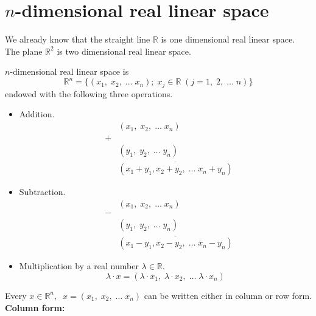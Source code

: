 \documentclass[color=black,11pt]{elegantpaper}
\begin{document}
\section{$n$-dimensional real linear space}
\label{sec:nspace}
We already know that the straight line $\mathbb{R}$ is one dimensional real linear space. The plane $\mathbb{R}^2$ is two dimensional real linear space.

\begin{definition}
\label{def:nspace}
 $n$-dimensional real linear space is
$$
\mathbb{R}^n =\{(x_1,\; x_2,\; \dots \; x_n);\;x_j \in \mathbb{R}\;(j=1,\;2,\;\dots\;n)\}
$$
endowed with the following three operations.
\begin{itemize}
\item[]Addition.
\begin{eqnarray*}
&& (x_1,\;x_2,\;\dots\;x_n) \\
&+&\\
&& (y_1,\; y_2,\; \dots \; y_n)\\
&&\overline{(x_1+y_1,x_2+y_2, \; \dots \; x_n+y_n)}
\end{eqnarray*}
\item[]Subtraction.
\begin{eqnarray*}
&& (x_1,\;x_2,\;\dots\;x_n) \\
&-&\\
&& (y_1,\; y_2,\; \dots \; y_n)\\
&&\overline{(x_1-y_1,x_2-y_2, \; \dots \; x_n-y_n)}
\end{eqnarray*}
\item[] Multiplication by a real number $\lambda \in \mathbb{R}.$
$$
\lambda \cdot x = (\lambda \cdot x_1,\; \lambda \cdot x_2,\; \dots\; \lambda \cdot x_n)
$$
\end{itemize}
\end{definition}
Every $x\in \mathbb{R}^n,\;\;x=(x_1,\;x_2,\;\dots\;x_n)$ can be written either in column or row form.\\
{\bf Column form:}\\
\end{document}
